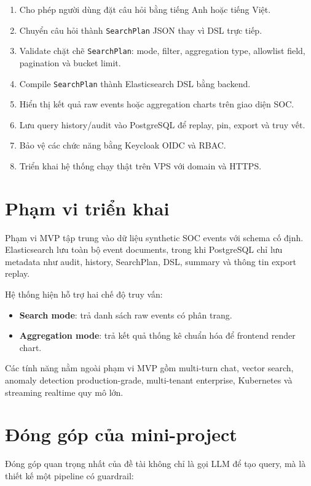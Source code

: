 \documentclass[12pt,a4paper]{report}
\begin{document}
\begin{enumerate}
    \item Cho phép người dùng đặt câu hỏi bằng tiếng Anh hoặc tiếng Việt.
    \item Chuyển câu hỏi thành \texttt{SearchPlan} JSON thay vì DSL trực tiếp.
    \item Validate chặt chẽ \texttt{SearchPlan}: mode, filter, aggregation type, allowlist field, pagination và bucket limit.
    \item Compile \texttt{SearchPlan} thành Elasticsearch DSL bằng backend.
    \item Hiển thị kết quả raw events hoặc aggregation charts trên giao diện SOC.
    \item Lưu query history/audit vào PostgreSQL để replay, pin, export và truy vết.
    \item Bảo vệ các chức năng bằng Keycloak OIDC và RBAC.
    \item Triển khai hệ thống chạy thật trên VPS với domain và HTTPS.
\end{enumerate}

\section{Phạm vi triển khai}

Phạm vi MVP tập trung vào dữ liệu synthetic SOC events với schema cố định. Elasticsearch lưu toàn bộ event documents, trong khi PostgreSQL chỉ lưu metadata như audit, history, SearchPlan, DSL, summary và thông tin export replay.

Hệ thống hiện hỗ trợ hai chế độ truy vấn:

\begin{itemize}
    \item \textbf{Search mode}: trả danh sách raw events có phân trang.
    \item \textbf{Aggregation mode}: trả kết quả thống kê chuẩn hóa để frontend render chart.
\end{itemize}

Các tính năng nằm ngoài phạm vi MVP gồm multi-turn chat, vector search, anomaly detection production-grade, multi-tenant enterprise, Kubernetes và streaming realtime quy mô lớn.

\section{Đóng góp của mini-project}

Đóng góp quan trọng nhất của đề tài không chỉ là gọi LLM để tạo query, mà là thiết kế một pipeline có guardrail:
\end{document}
